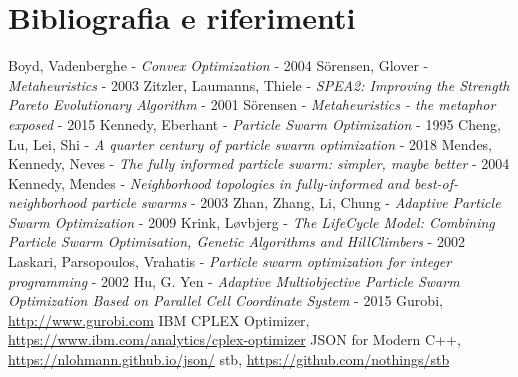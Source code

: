 \documentclass[12pt]{article}
\begin{document}
\section*{\hfil Bibliografia e riferimenti \hfil}
\renewcommand{\section}[2]{}
\begin{thebibliography}{1}

 Boyd, Vadenberghe - {\em Convex Optimization} - 2004
 Sörensen, Glover - {\em Metaheuristics} - 2003
 Zitzler, Laumanns, Thiele - {\em SPEA2: Improving the Strength Pareto Evolutionary Algorithm} - 2001
 Sörensen - {\em Metaheuristics - the metaphor exposed} - 2015
 Kennedy, Eberhant - {\em Particle Swarm Optimization} - 1995
 Cheng, Lu, Lei, Shi - {\em A quarter century of particle swarm optimization} - 2018
 Mendes, Kennedy, Neves - {\em The fully informed particle swarm: simpler, maybe better} - 2004
 Kennedy, Mendes - {\em Neighborhood topologies in fully-informed and best-of-neighborhood particle swarms} - 2003
 Zhan, Zhang, Li, Chung - {\em Adaptive Particle Swarm  Optimization} - 2009
 Krink, Løvbjerg - {\em The LifeCycle Model: Combining Particle Swarm Optimisation, Genetic Algorithms and HillClimbers} - 2002
 Laskari, Parsopoulos, Vrahatis - {\em Particle swarm optimization for integer programming} - 2002
 Hu, G. Yen - {\em Adaptive Multiobjective Particle Swarm Optimization Based on Parallel Cell Coordinate System} - 2015
 Gurobi, \url{http://www.gurobi.com}
 IBM CPLEX Optimizer, \url{https://www.ibm.com/analytics/cplex-optimizer}
 JSON for Modern C++, \url{https://nlohmann.github.io/json/}
 stb, \url{https://github.com/nothings/stb}

\end{thebibliography}
\end{document}
